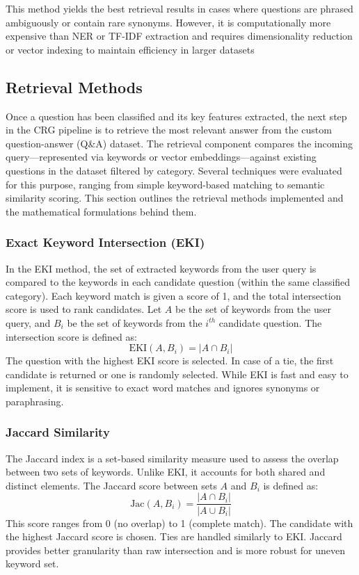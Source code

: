 \documentclass[conference]{IEEEtran}
\begin{document}
This method yields the best retrieval results in cases where questions are phrased ambiguously or contain rare synonyms. 
However, it is computationally more expensive than NER or TF-IDF extraction and requires dimensionality reduction or vector indexing to maintain efficiency in larger datasets

\subsection{Retrieval Methods}
Once a question has been classified and its key features extracted, the next step in the CRG pipeline is to retrieve the most relevant answer from the custom question-answer (Q\&A) dataset. 
The retrieval component compares the incoming query—represented via keywords or vector embeddings—against existing questions in the dataset filtered by category. 
Several techniques were evaluated for this purpose, ranging from simple keyword-based matching to semantic similarity scoring. 
This section outlines the retrieval methods implemented and the mathematical formulations behind them.

\subsubsection{Exact Keyword Intersection (EKI)}
In the EKI method, the set of extracted keywords from the user query is compared to the keywords in each candidate question (within the same classified category). 
Each keyword match is given a score of 1, and the total intersection score is used to rank candidates.
Let $A$ be the set of keywords from the user query, and $B_i$ be the set of keywords from the $i^{th}$ candidate question.
The intersection score is defined as:
\begin{equation}
    \text{EKI}(A, B_i) = |A \cap B_i| 
\end{equation}
The question with the highest EKI score is selected. 
In case of a tie, the first candidate is returned or one is randomly selected. 
While EKI is fast and easy to implement, it is sensitive to exact word matches and ignores synonyms or paraphrasing.

\subsubsection{Jaccard Similarity}
The Jaccard index is a set-based similarity measure used to assess the overlap between two sets of keywords. 
Unlike EKI, it accounts for both shared and distinct elements.
The Jaccard score between sets $A$ and $B_i$ is defined as:
\begin{equation}
    \text{Jac}(A, B_i) = \frac{|A \cap B_i|}{|A \cup B_i|}
\end{equation}
This score ranges from 0 (no overlap) to 1 (complete match). 
The candidate with the highest Jaccard score is chosen. 
Ties are handled similarly to EKI. 
Jaccard provides better granularity than raw intersection and is more robust for uneven keyword set.
\end{document}
